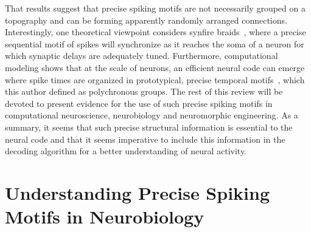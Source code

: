 \documentclass[brainsci, %
               review,accept,pdftex,moreauthors
               ]{Definitions/mdpi}
\begin{document}
That results suggest that precise spiking motifs are not necessarily grouped on a topography and can be forming apparently randomly arranged connections. Interestingly, one theoretical viewpoint considers synfire braids~\citep{bienenstock_model_1995}, where a precise sequential motif of spikes will synchronize as it reaches the soma of a neuron for which synaptic delays are adequately tuned. Furthermore, computational modeling shows that at the scale of neurons, an efficient neural code can emerge where spike times are organized in prototypical, precise temporal motifs~\citep{izhikevich_polychronization_2006}, which this author defined as polychronous groups. The rest of this review will be devoted to present evidence for the use of such precise spiking motifs in computational neuroscience, neurobiology and neuromorphic engineering. As a summary, it seems that such precise structural information is essential to the neural code and that it seems imperative to include this information in the decoding algorithm for a better understanding of neural activity.
%
\section{Understanding Precise Spiking Motifs in Neurobiology}\label{sec:detection}
\end{document}
